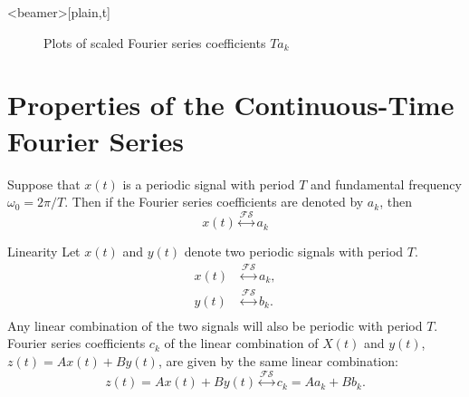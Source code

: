 \begin{frame}<beamer>[plain,t]
    \begin{figure}
      \centering
      
      \caption{Plots of scaled Fourier series coefficients $Ta_k$}\label{fi:example02_periodic_square_fs}
    \end{figure}
\end{frame}


\section{Properties of the Continuous-Time Fourier Series}

\begin{frame}
    Suppose that $x(t)$ is a periodic signal with period $T$ and fundamental frequency $\omega_0 = 2\pi/T$. Then if the Fourier series coefficients are denoted by $a_k$, then
    \begin{equation}
        x(t) \overset{\mathcal{FS}}{\longleftrightarrow} a_k
    \end{equation}
\end{frame}

\begin{frame}{Linearity}
    Let $x(t)$ and $y(t)$ denote two periodic signals with period $T$.
    \begin{align*}
        x(t) &\overset{\mathcal{FS}}{\longleftrightarrow} a_k,\\
        y(t) &\overset{\mathcal{FS}}{\longleftrightarrow} b_k.\\
    \end{align*}
    Any linear combination of the two signals will also be periodic with period $T$. Fourier series coefficients $c_k$ of the linear combination of $X(t)$ and $y(t)$, $z(t) = Ax(t) + By(t)$, are given by the same linear combination:
    {
        \begin{equation}
            z(t) = Ax(t) + By(t)\overset{\mathcal{FS}}{\longleftrightarrow} c_k = Aa_k + Bb_k.
        \end{equation}
    }
\end{frame}

